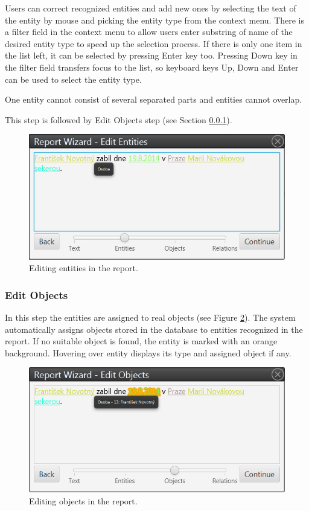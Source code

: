 Users can correct recognized entities and add new ones by selecting the text
of the entity by mouse and picking the entity type from the context menu.
There is a filter field in the context menu to allow users enter substring of
name of the desired entity type to speed up the selection process. If there is
only one item in the list left, it can be selected by pressing Enter key too.
Pressing Down key in the filter field transfers focus to the list, so keyboard
keys Up, Down and Enter can be used to select the entity type.

One entity cannot consist of several separated parts and entities cannot
overlap.

This step is followed by Edit Objects step (see Section
\ref{sssec:EditObjects}).

\begin{figure}[!htb]
        \centering
        \includegraphics[width=\textwidth]{Images/entities}
        \caption{Editing entities in the report.}
        \label{fig:Entities}
\end{figure}

\subsubsection{Edit Objects}
\label{sssec:EditObjects}

In this step the entities are assigned to real objects (see Figure
\ref{fig:Objects}). The system automatically assigns objects stored in the
database to entities recognized in the report. If no suitable object is
found, the entity is marked with an orange background. Hovering over entity
displays its type and assigned object if any.

\begin{figure}[!htb]
        \centering
        \includegraphics[width=\textwidth]{Images/objects}
        \caption{Editing objects in the report.}
        \label{fig:Objects}
\end{figure}

